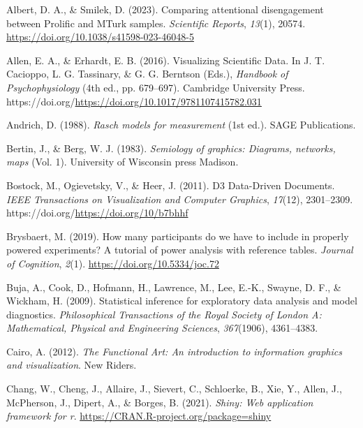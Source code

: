 \documentclass[
  10pt,
  letterpaper,
  DIV=11,
  numbers=noendperiod]{scrartcl}
\newlength{\cslhangindent}
\newenvironment{CSLReferences}[2] %
 {\begin{list}{}{%
  \setlength{\itemindent}{0pt}
  \setlength{\leftmargin}{0pt}
  \setlength{\parsep}{0pt}
  \ifodd #1
   \setlength{\leftmargin}{\cslhangindent}
   \setlength{\itemindent}{-1\cslhangindent}
  \fi
  \setlength{\itemsep}{#2\baselineskip}}}
 {\end{list}}
\begin{document}
\label{refs}
\begin{CSLReferences}{1}{0}
Albert, D. A., \& Smilek, D. (2023). Comparing attentional disengagement
between {Prolific} and {MTurk} samples. \emph{Scientific Reports},
\emph{13}(1), 20574. \url{https://doi.org/10.1038/s41598-023-46048-5}

Allen, E. A., \& Erhardt, E. B. (2016). Visualizing {Scientific} {Data}.
In J. T. Cacioppo, L. G. Tassinary, \& G. G. Berntson (Eds.),
\emph{Handbook of {Psychophysiology}} (4th ed., pp. 679--697). Cambridge
University Press.
https://doi.org/\url{https://doi.org/10.1017/9781107415782.031}

Andrich, D. (1988). \emph{Rasch models for measurement} (1st ed.).
{SAGE} Publications.

Bertin, J., \& Berg, W. J. (1983). \emph{Semiology of graphics:
Diagrams, networks, maps} (Vol. 1). University of Wisconsin press
Madison.

Bostock, M., Ogievetsky, V., \& Heer, J. (2011). D3 {Data}-{Driven}
{Documents}. \emph{IEEE Transactions on Visualization and Computer
Graphics}, \emph{17}(12), 2301--2309.
https://doi.org/\url{https://doi.org/10/b7bhhf}

Brysbaert, M. (2019). How many participants do we have to include in
properly powered experiments? {A} tutorial of power analysis with
reference tables. \emph{Journal of Cognition}, \emph{2}(1).
\url{https://doi.org/10.5334/joc.72}

Buja, A., Cook, D., Hofmann, H., Lawrence, M., Lee, E.-K., Swayne, D.
F., \& Wickham, H. (2009). Statistical inference for exploratory data
analysis and model diagnostics. \emph{Philosophical Transactions of the
Royal Society of London A: Mathematical, Physical and Engineering
Sciences}, \emph{367}(1906), 4361--4383.

Cairo, A. (2012). \emph{The {Functional} {Art}: {An} introduction to
information graphics and visualization}. New Riders.

Chang, W., Cheng, J., Allaire, J., Sievert, C., Schloerke, B., Xie, Y.,
Allen, J., McPherson, J., Dipert, A., \& Borges, B. (2021). \emph{Shiny:
Web application framework for r}.
\url{https://CRAN.R-project.org/package=shiny}


\end{CSLReferences}
\end{document}
